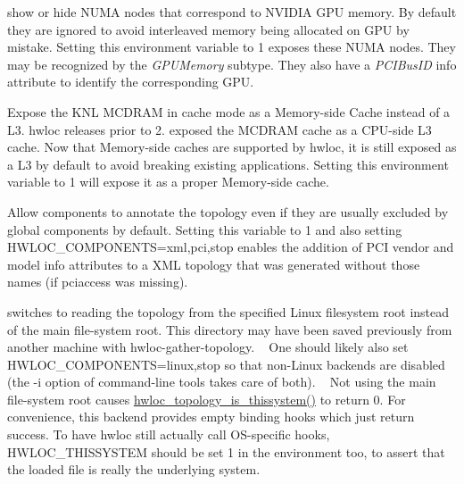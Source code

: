 \begin{DoxyDescription}
\item[H\+W\+L\+O\+C\+\_\+\+K\+E\+E\+P\+\_\+\+N\+V\+I\+D\+I\+A\+\_\+\+G\+P\+U\+\_\+\+N\+U\+M\+A\+\_\+\+N\+O\+D\+ES=0 ]show or hide N\+U\+MA nodes that correspond to N\+V\+I\+D\+IA G\+PU memory. By default they are ignored to avoid interleaved memory being allocated on G\+PU by mistake. Setting this environment variable to 1 exposes these N\+U\+MA nodes. They may be recognized by the {\itshape G\+P\+U\+Memory} subtype. They also have a {\itshape P\+C\+I\+Bus\+ID} info attribute to identify the corresponding G\+PU. 


\item[H\+W\+L\+O\+C\+\_\+\+K\+N\+L\+\_\+\+M\+S\+C\+A\+C\+H\+E\+\_\+\+L3=0 ]Expose the K\+NL M\+C\+D\+R\+AM in cache mode as a Memory-\/side Cache instead of a L3. hwloc releases prior to 2. exposed the M\+C\+D\+R\+AM cache as a C\+P\+U-\/side L3 cache. Now that Memory-\/side caches are supported by hwloc, it is still exposed as a L3 by default to avoid breaking existing applications. Setting this environment variable to 1 will expose it as a proper Memory-\/side cache. 


\item[H\+W\+L\+O\+C\+\_\+\+A\+N\+N\+O\+T\+A\+T\+E\+\_\+\+G\+L\+O\+B\+A\+L\+\_\+\+C\+O\+M\+P\+O\+N\+E\+N\+TS=0 ]Allow components to annotate the topology even if they are usually excluded by global components by default. Setting this variable to 1 and also setting {\ttfamily H\+W\+L\+O\+C\+\_\+\+C\+O\+M\+P\+O\+N\+E\+N\+TS=xml,pci,stop} enables the addition of P\+CI vendor and model info attributes to a X\+ML topology that was generated without those names (if pciaccess was missing). 


\item[H\+W\+L\+O\+C\+\_\+\+F\+S\+R\+O\+OT=/path/to/linux/filesystem-\/root/ ]switches to reading the topology from the specified Linux filesystem root instead of the main file-\/system root. This directory may have been saved previously from another machine with {\ttfamily hwloc-\/gather-\/topology}. ~\newline
 One should likely also set {\ttfamily H\+W\+L\+O\+C\+\_\+\+C\+O\+M\+P\+O\+N\+E\+N\+TS=linux,stop} so that non-\/\+Linux backends are disabled (the {\ttfamily -\/i} option of command-\/line tools takes care of both). ~\newline
 Not using the main file-\/system root causes \hyperlink{a00193_ga68ffdcfd9175cdf40709801092f18017}{hwloc\+\_\+topology\+\_\+is\+\_\+thissystem()} to return 0. For convenience, this backend provides empty binding hooks which just return success. To have hwloc still actually call O\+S-\/specific hooks, H\+W\+L\+O\+C\+\_\+\+T\+H\+I\+S\+S\+Y\+S\+T\+EM should be set 1 in the environment too, to assert that the loaded file is really the underlying system. 



\end{DoxyDescription}
